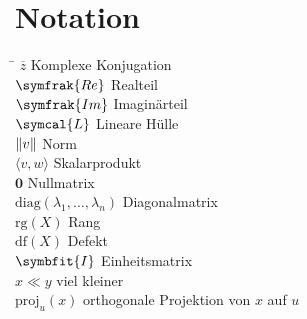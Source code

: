 \chapter*{Notation}
\begin{tabbing}
    \hspace{4cm} \= \kill
    \(\overline{z}\) \>  Komplexe Konjugation \\
    \(\symfrak{Re}\) \>  Realteil \\
    \(\symfrak{Im}\) \>  Imaginärteil \\
    \(\symcal{L}\)   \>  Lineare Hülle \\ 
    \(\lVert v\rVert\)     \>  Norm \\ 
    \(\langle v,w \rangle\) \> Skalarprodukt \\
    \(\symbf{0}\) \> Nullmatrix \\
    \(\text{diag}(\lambda_1,\ldots,\lambda_n)\) \> Diagonalmatrix \\
    \(\text{rg}(X)\) \> Rang \\
    \(\text{df}(X)\) \> Defekt \\
    \(\symbfit{I}\) \> Einheitsmatrix \\
    \(x \ll y\) \> viel kleiner \\
    \(\text{proj}_{u}(x)\) \> orthogonale Projektion von \(x\) auf \(u\) \\
\end{tabbing}
